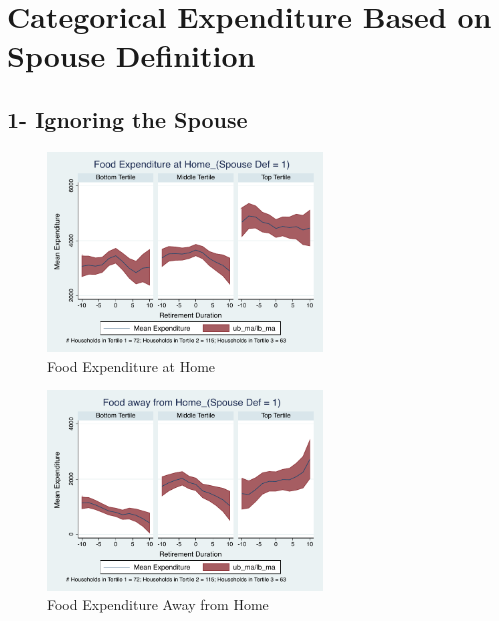 \documentclass[11pt,onecolumn]{article}
\numberwithin{figure}{section}
\begin{document}
\clearpage

\section{Categorical Expenditure Based on Spouse Definition}

\subsection{1- Ignoring the Spouse}

\begin{figure}[h]
	\caption{Food Expenditure at Home}
	\centering
	\includegraphics[width=0.65\textwidth]{../ConsumptionPostRetirement_by_SpouseDef_Cats/Smoothed/1/spouse_def_total_foodexp_home_real.pdf}
\end{figure}


\begin{figure}[h]
	\caption{Food Expenditure Away from Home}
	\centering
	\includegraphics[width=0.65\textwidth]{../ConsumptionPostRetirement_by_SpouseDef_Cats/Smoothed/1/spouse_def_total_foodexp_away_real.pdf}
\end{figure}

\clearpage
\end{document}
